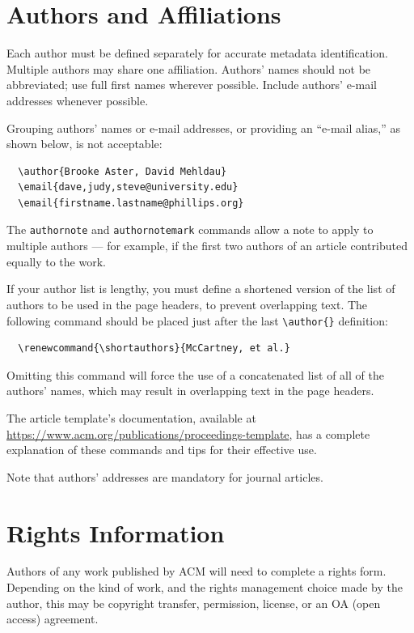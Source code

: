 \documentclass[sigconf]{acmart}
\begin{document}
\section{Authors and Affiliations}

Each author must be defined separately for accurate metadata
identification. Multiple authors may share one affiliation. Authors'
names should not be abbreviated; use full first names wherever
possible. Include authors' e-mail addresses whenever possible.

Grouping authors' names or e-mail addresses, or providing an ``e-mail
alias,'' as shown below, is not acceptable:
\begin{verbatim}
  \author{Brooke Aster, David Mehldau}
  \email{dave,judy,steve@university.edu}
  \email{firstname.lastname@phillips.org}
\end{verbatim}

The \verb|authornote| and \verb|authornotemark| commands allow a note
to apply to multiple authors --- for example, if the first two authors
of an article contributed equally to the work.

If your author list is lengthy, you must define a shortened version of
the list of authors to be used in the page headers, to prevent
overlapping text. The following command should be placed just after
the last \verb|\author{}| definition:
\begin{verbatim}
  \renewcommand{\shortauthors}{McCartney, et al.}
\end{verbatim}
Omitting this command will force the use of a concatenated list of all
of the authors' names, which may result in overlapping text in the
page headers.

The article template's documentation, available at
\url{https://www.acm.org/publications/proceedings-template}, has a
complete explanation of these commands and tips for their effective
use.

Note that authors' addresses are mandatory for journal articles.

\section{Rights Information}

Authors of any work published by ACM will need to complete a rights
form. Depending on the kind of work, and the rights management choice
made by the author, this may be copyright transfer, permission,
license, or an OA (open access) agreement.
\end{document}
